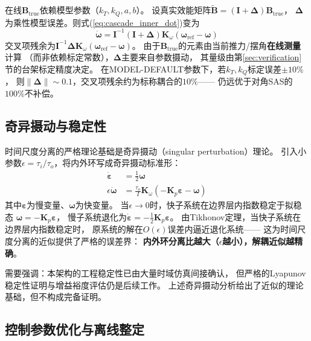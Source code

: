 在线$\mathbf{B}_{\mathrm{true}}$依赖模型参数（$k_T,k_Q,a,b$）。
设真实效能矩阵$\tilde{\mathbf{B}}=(\mathbf{I}+\boldsymbol{\Delta})\mathbf{B}_{\mathrm{true}}$，
$\boldsymbol{\Delta}$为乘性模型误差。则式(\ref{eq:cascade_inner_dot})变为
\begin{equation}
    \dot{\boldsymbol{\omega}}
    = \mathbf{I}^{-1}(\mathbf{I}+\boldsymbol{\Delta})
      \mathbf{K}_\omega(\boldsymbol{\omega}_{\mathrm{ref}}-\boldsymbol{\omega})
    \label{eq:cascade_model_err}
\end{equation}
交叉项残余为$\mathbf{I}^{-1}\boldsymbol{\Delta}\mathbf{K}_\omega
(\boldsymbol{\omega}_{\mathrm{ref}}-\boldsymbol{\omega})$。
由于$\mathbf{B}_{\mathrm{true}}$的元素由当前推力/摆角\textbf{在线测量}计算
（而非依赖标定常数），$\boldsymbol{\Delta}$主要来自参数摄动，
其量级由第\ref{sec:verification}节的台架标定精度决定。
在MODEL-DEFAULT参数下，若$k_T,k_Q$标定误差$\pm10\%$，
则$\|\boldsymbol{\Delta}\|\sim0.1$，交叉项残余约为标称耦合的$10\%$——
仍远优于对角SAS的$100\%$不补偿。

\subsection{奇异摄动与稳定性}
\label{sec:cascade_sp}

时间尺度分离的严格理论基础是奇异摄动（singular perturbation）理论。
引入小参数$\epsilon=\tau_i/\tau_o$，将内外环写成奇异摄动标准形：
\begin{align}
    \dot{\boldsymbol{\varepsilon}} &= \frac{1}{2}\boldsymbol{\omega}
    \label{eq:sp_slow}\\
    \epsilon\dot{\boldsymbol{\omega}} &= \frac{\tau_o}{I}\mathbf{K}_\omega
    \left(-\mathbf{K}_p\boldsymbol{\varepsilon}-\boldsymbol{\omega}\right)
    \label{eq:sp_fast}
\end{align}
其中$\boldsymbol{\varepsilon}$为慢变量、$\boldsymbol{\omega}$为快变量。
当$\epsilon\to0$时，快子系统在边界层内指数稳定于拟稳态
$\boldsymbol{\omega}=-\mathbf{K}_p\boldsymbol{\varepsilon}$，
慢子系统退化为$\dot{\boldsymbol{\varepsilon}}=-\frac{1}{2}\mathbf{K}_p\boldsymbol{\varepsilon}$。
由Tikhonov定理，当快子系统在边界层内指数稳定时，
原系统的解在$O(\epsilon)$误差内逼近退化系统——
这为时间尺度分离的近似提供了严格的误差界：
\textbf{内外环分离比越大（$\epsilon$越小），解耦近似越精确}。

需要强调：本架构的工程稳定性已由大量时域仿真间接确认，
但严格的Lyapunov稳定性证明与增益裕度评估仍是后续工作。
上述奇异摄动分析给出了近似的理论基础，但不构成完备证明。

\subsection{控制参数优化与离线整定}
\label{sec:cascade_tuning}

